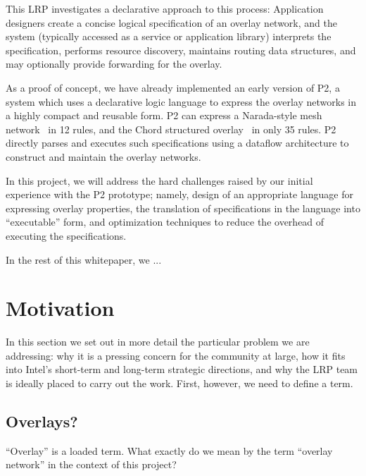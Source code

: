 \documentclass[twocolumn,10pt]{article}
\def\Sys{P2\xspace}
\begin{document}
This LRP investigates a declarative approach to this process: 
Application designers create a concise logical
specification of an overlay network, and the system (typically
accessed as a service or application library) interprets the
specification, performs resource discovery, maintains routing data
structures, and may optionally provide forwarding for the overlay.

As a proof of concept, we have already implemented an early version of
\Sys, a system which uses a declarative logic
language to express the overlay networks in a highly compact and
reusable form. \Sys can express a Narada-style mesh
network~\cite{chu00case} in 12 rules, and the Chord structured
overlay~\cite{chord} in only 35 rules.  \Sys directly parses and
executes such  specifications using a dataflow architecture to
construct and maintain the overlay networks.

In this project, we will address the hard challenges raised by our
initial experience with the \Sys prototype; namely, design of an
appropriate language for expressing overlay properties, the
translation of specifications in the language into ``executable''
form, and optimization techniques to reduce the overhead of executing
the specifications. 

In the rest of this whitepaper, we ...


\section{Motivation}
\label{sec:forwhom}

In this section we set out in more detail the particular problem we
are addressing: why it is a pressing concern for the community at
large, how it fits into Intel's short-term and long-term strategic
directions, and why the LRP team is ideally placed to carry out the
work.   First, however, we need to define a term. 

\subsection{Overlays?}

``Overlay'' is a loaded term.  What exactly do we mean 
by the term ``overlay network'' in the context of this project?
\end{document}
